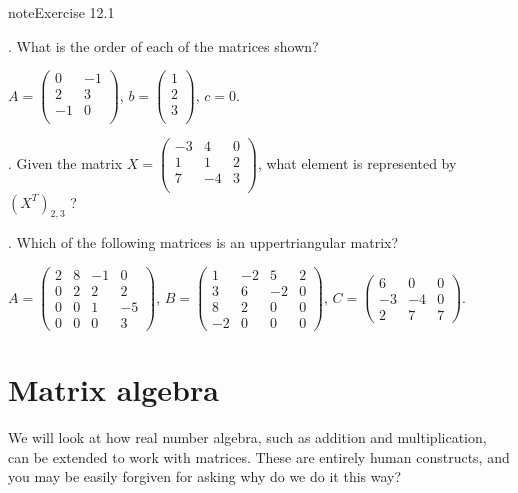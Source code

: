 \documentclass[letterpaper,10pt,english]{jupyterBook}
\begin{document}
\begin{sphinxadmonition}{note}{Exercise 12.1}



. What is the order of each of the matrices shown?

\sphinxAtStartPar
\(A=\left(\begin{array}{cc}0 & -1 \\2 & 3 \\-1 & 0 \\\end{array}\right)\),   \(b=\left(\begin{array}{c}1 \\2 \\3 \\\end{array}\right)\),   \(c=0\).

. Given the matrix \(X=\left(\begin{array}{ccc}-3 & 4 & 0 \\1 & 1 & 2 \\7 & -4 & 3 \\\end{array}\right)\), what element is represented by \((X^T)_{2,3}\) ?

. Which of the following matrices is an upper\sphinxhyphen{}triangular matrix?

\sphinxAtStartPar
\(A=\left(\begin{array}{cccc}2&8&-1&0\\0&2&2&2\\0&0&1&-5\\0&0&0&3\end{array}\right)\), \(B=\left(\begin{array}{cccc}1&-2&5&2\\3&6&-2&0\\8&2&0&0\\-2&0&0&0\end{array}\right)\), \(C=\left(\begin{array}{ccc}6&0&0\\-3&-4&0\\2&7&7\end{array}\right)\).
\end{sphinxadmonition}


\section{Matrix algebra}
\label{\detokenize{LinearAlgebra/linear_systems_matrices/matrices:matrix-algebra}}
\sphinxAtStartPar
We will look at how real number algebra, such as addition and multiplication, can be extended to work with matrices. These are entirely human constructs, and you may be easily forgiven for asking why do we do it this way?
\end{document}
